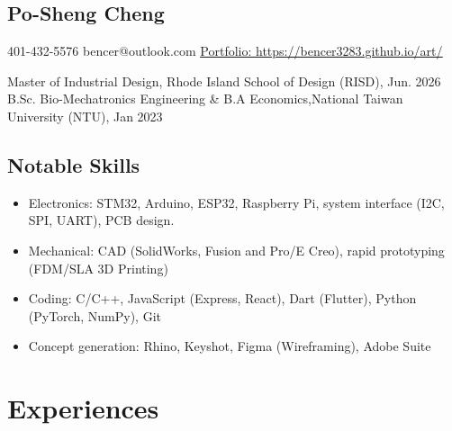 \documentclass[12pt]{article}
\begin{document}
\begin{multicols}{2}
    \section*{Po-Sheng Cheng}
    401-432-5576 \newline
    bencer@outlook.com \newline
    \href{https://bencer3283.github.io/art/}{\underline{Portfolio: https://bencer3283.github.io/art/}}
    
    \columnbreak
    {\sffamily \small \noindent
    Master of Industrial Design, Rhode Island School of Design (RISD), Jun. 2026 \newline \newline
    B.Sc. Bio-Mechatronics Engineering \& B.A Economics,\newline National Taiwan University (NTU), Jan 2023
    }
\end{multicols}
\subsection*{Notable Skills}
{ \small \begin{itemize}
    \item Electronics: STM32, Arduino, ESP32, Raspberry Pi, system interface (I2C, SPI, UART), PCB design.
    \item Mechanical: CAD (SolidWorks, Fusion and Pro/E Creo), rapid prototyping (FDM/SLA 3D Printing)
    \item Coding: C/C++, JavaScript (Express, React), Dart (Flutter), Python (PyTorch, NumPy), Git
    \item Concept generation: Rhino, Keyshot, Figma (Wireframing), Adobe Suite
\end{itemize}}
    \section*{Experiences}
\end{document}
